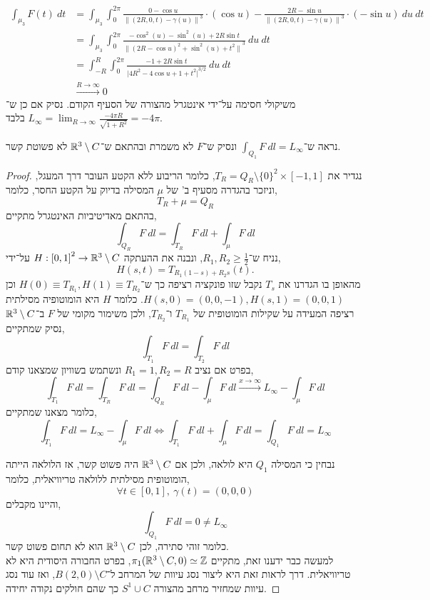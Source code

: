 \begin{solution}
	\begin{align*}
		\int_{\mu_3} F(t)\ dt
		& = \int_{\mu_3} \int_{0}^{2 \pi} \frac{0 - \cos u}{{\lVert (2R, 0, t) - \gamma(u) \rVert}^3} \cdot (\cos u) - \frac{2R - \sin u}{{\lVert (2R, 0, t) - \gamma(u) \rVert}^3} \cdot (- \sin u)\ du\ dt \\
		& = \int_{\mu_3} \int_{0}^{2 \pi} \frac{- \cos^2(u) - \sin^2(u) + 2R \sin t}{{\lVert {(2R - \cos u)}^2 + \sin^2(u) + t^2 \rVert}^3}\ du\ dt \\
		& = \int_{-R}^{R} \int_{0}^{2 \pi} \frac{-1 + 2R \sin t}{\lvert {4R^2 - 4 \cos u + 1 + t^2 \rvert}^{3 / 2}}\ du\ dt \\
		& \xrightarrow{R \to \infty} 0
	\end{align*}
	משיקולי חסימה על־ידי אינטגרל מהצורה של הסעיף הקודם.
	נסיק אם כן ש־$L_{\infty} = \lim_{R \to \infty} \frac{-4 \pi R}{\sqrt{1 + R^2}} = -4 \pi$ בלבד.
\end{solution}

\subquestion{}
נראה ש־$\int_{Q_1} F\ dl = L_{\infty}$ ונסיק ש־$F$ לא משמרת ובהתאם ש־$\mathbb{R}^3 \setminus C$ לא פשוטת קשר.
\begin{proof}
	נגדיר את $T_R = Q_R \setminus {\{ 0 \}}^2 \times [-1, 1]$, כלומר הריבוע ללא הקטע העובר דרך המעגל, וניזכר בהגדרה מסעיף ב' של $\mu$ המסילה בדיוק על הקטע החסר, כלומר,
	\[
		T_R + \mu
		= Q_R
	\]
	בהתאם מאדיטיביות האינטגרל מתקיים,
	\[
		\int_{Q_R} F\ dl
		= \int_{T_R} F\ dl + \int_{\mu} F\ dl
	\]
	נניח ש־$R_1, R_2 \ge \frac{1}{2}$, ונבנה את ההעתקה $H : {[0, 1]}^2 \to \mathbb{R}^3 \setminus C$ על־ידי,
	\[
		H(s, t)
		= T_{R_1 (1 - s) + R_2 s}(t)
	.\]
	מהאופן בו הגדרנו את $T_s$ נקבל שזו פונקציה רציפה כך ש־$H(0) \equiv T_{R_1}, H(1) \equiv T_{R_2}$ וכן $H(s, 0) = (0, 0, -1), H(s, 1) = (0, 0, 1)$.
	כלומר $H$ היא הומוטופיה מסילתית רציפה המעידה על שקילות הומוטופית של $T_{R_1}$ ו־$T_{R_2}$, ולכן משימור מקומי של $F$ ב־$\mathbb{R}^3 \setminus C$ נסיק שמתקיים,
	\[
		\int_{T_1} F\ dl
		= \int_{T_2} F\ dl
	\]
	בפרט אם נציב $R_1 = 1, R_2 = R$ ונשתמש בשוויון שמצאנו קודם,
	\[
		\int_{T_1} F\ dl
		= \int_{T_R} F\ dl
		= \int_{Q_R} F\ dl - \int_{\mu} F\ dl
		\xrightarrow{x \to \infty} L_{\infty} - \int_{\mu} F\ dl
	\]
	כלומר מצאנו שמתקיים,
	\[
		\int_{T_1} F\ dl
		= L_{\infty} - \int_{\mu} F\ dl
		\iff
		\int_{T_1} F\ dl + \int_{\mu} F\ dl
		= \int_{Q_1} F\ dl
		= L_{\infty}
	\]

	נבחין כי המסילה $Q_1$ היא לולאה, ולכן אם $\mathbb{R}^3 \setminus C$ היה פשוט קשר, אז הלולאה הייתה הומוטופית מסילתית ללולאה טריוויאלית, כלומר,
	\[
		\forall t \in [0, 1],\ \gamma(t) = (0, 0, 0)
	\]
	והיינו מקבלים,
	\[
		\int_{Q_1} F\ dl
		= 0
		\ne L_{\infty}
	\]
	כלומר זוהי סתירה, לכן $\mathbb{R}^3 \setminus C$ הוא לא תחום פשוט קשר. \\
	למעשה כבר ידענו זאת, מתקיים $\pi_1(\mathbb{R}^3 \setminus C, 0) \simeq \mathbb{Z}$, בפרט החבורה היסודית היא לא טריוויאלית.
	דרך לראות זאת היא ליצור נסג עיוות של המרחב ל־$B(2, 0) \setminus C$, ואז עוד נסג עיוות שמחזיר מרחב מהצורה $S^1 \cup C$ כך שהם חולקים נקודה יחידה.
\end{proof}

